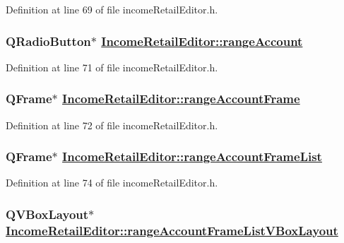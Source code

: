 Definition at line 69 of file income\-Retail\-Editor.h.\hypertarget{classIncomeRetailEditor_r14}{
\subsubsection[rangeAccount]{\setlength{\rightskip}{0pt plus 5cm}QRadio\-Button$\ast$ \hyperlink{classIncomeRetailEditor_r14}{Income\-Retail\-Editor::range\-Account}}}
\label{classIncomeRetailEditor_r14}


Definition at line 71 of file income\-Retail\-Editor.h.\hypertarget{classIncomeRetailEditor_r15}{
\subsubsection[rangeAccountFrame]{\setlength{\rightskip}{0pt plus 5cm}QFrame$\ast$ \hyperlink{classIncomeRetailEditor_r15}{Income\-Retail\-Editor::range\-Account\-Frame}}}
\label{classIncomeRetailEditor_r15}


Definition at line 72 of file income\-Retail\-Editor.h.\hypertarget{classIncomeRetailEditor_r17}{
\subsubsection[rangeAccountFrameList]{\setlength{\rightskip}{0pt plus 5cm}QFrame$\ast$ \hyperlink{classIncomeRetailEditor_r17}{Income\-Retail\-Editor::range\-Account\-Frame\-List}}}
\label{classIncomeRetailEditor_r17}


Definition at line 74 of file income\-Retail\-Editor.h.\hypertarget{classIncomeRetailEditor_r18}{
\subsubsection[rangeAccountFrameListVBoxLayout]{\setlength{\rightskip}{0pt plus 5cm}QVBox\-Layout$\ast$ \hyperlink{classIncomeRetailEditor_r18}{Income\-Retail\-Editor::range\-Account\-Frame\-List\-VBox\-Layout}}}
\label{classIncomeRetailEditor_r18}


